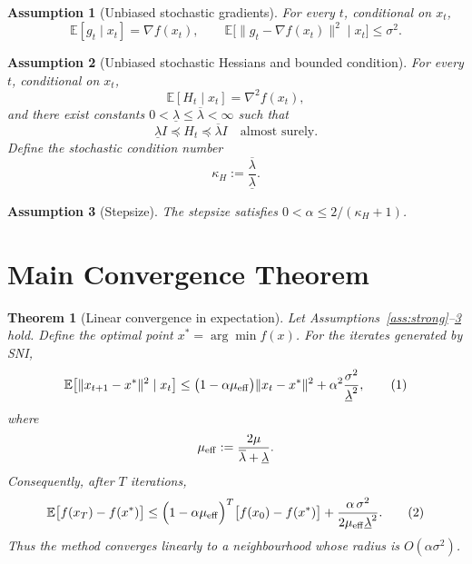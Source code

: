\documentclass{article}
\newtheorem{theorem}{Theorem}
\newtheorem{assumption}{Assumption}
\begin{document}
\begin{assumption}[Unbiased stochastic gradients]\label{ass:grad}
For every $t$, conditional on $x_{t}$,
\[
\mathbb{E}[g_{t}\mid x_{t}]=\nabla f(x_{t}),\qquad
\mathbb{E}\bigl[\|g_{t}-\nabla f(x_{t})\|^{2}\mid x_{t}\bigr]\le\sigma^{2}.
\]
\end{assumption}

\begin{assumption}[Unbiased stochastic Hessians and bounded condition]\label{ass:hess}
For every $t$, conditional on $x_{t}$,
\[
\mathbb{E}[H_{t}\mid x_{t}]=\nabla^{2}f(x_{t}),
\]
and there exist constants $0<\underline{\lambda}\le\overline{\lambda}<\infty$ such that
\[
\underline{\lambda} I\preceq H_{t}\preceq\overline{\lambda} I
\quad\text{almost surely.}
\]
Define the stochastic condition number
\[
\kappa_{H}:=\frac{\overline{\lambda}}{\underline{\lambda}}.
\]
\end{assumption}

\begin{assumption}[Stepsize]\label{ass:stepsize}
The stepsize satisfies $0<\alpha\le 2/(\kappa_{H}+1)$.
\end{assumption}

\section*{Main Convergence Theorem}
\begin{theorem}[Linear convergence in expectation]\label{thm:linear}
Let Assumptions~\ref{ass:strong}--\ref{ass:stepsize} hold.
Define the optimal point $x^{*}=\arg\min f(x)$.  For the iterates generated
by SNI,
\[
\mathbb{E}\bigl[\|x_{t+1}-x^{*}\|^{2}\mid x_{t}\bigr]
\le
\bigl(1-\alpha\mu_{\rm eff}\bigr)\|x_{t}-x^{*}\|^{2}
+ \alpha^{2}\frac{\sigma^{2}}{\underline{\lambda}^{2}},
\tag{1}
\]
where
\[
\mu_{\rm eff}:=
\frac{2\mu}{\overline{\lambda}+\underline{\lambda}}.
\]
Consequently, after $T$ iterations,
\[
\mathbb{E}\bigl[f(x_{T})-f(x^{*})\bigr]
\le
\Bigl(1-\alpha\mu_{\rm eff}\Bigr)^{T}
\bigl[f(x_{0})-f(x^{*})\bigr]
+ \frac{\alpha\,\sigma^{2}}{2\mu_{\rm eff}\underline{\lambda}^{2}}.
\tag{2}
\]
Thus the method converges linearly to a neighbourhood whose radius is
$O(\alpha\sigma^{2})$.
\end{theorem}
\end{document}
